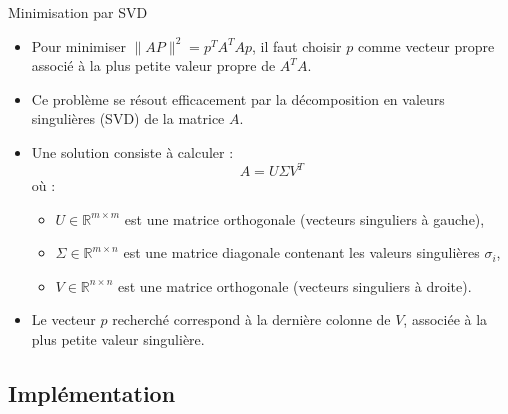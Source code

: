 \begin{frame}{Minimisation par SVD}

\begin{itemize}
  \item<1-> Pour minimiser \( \|AP\|^2 = p^T A^T A p \),  
  il faut choisir \( p \) comme vecteur propre associé à la plus petite valeur propre de \( A^T A \).
  
  \item<2-> Ce problème se résout efficacement par la décomposition en valeurs singulières (SVD) de la matrice \( A \).

  \item<3-> Une solution consiste à calculer :
  \[
  A = U \Sigma V^T
  \]
  où :
  \begin{itemize}
    \item<4-> \( U \in \mathbb{R}^{m \times m} \) est une matrice orthogonale (vecteurs singuliers à gauche),
    \item<5-> \( \Sigma \in \mathbb{R}^{m \times n} \) est une matrice diagonale contenant les valeurs singulières \( \sigma_i \),
    \item<6-> \( V \in \mathbb{R}^{n \times n} \) est une matrice orthogonale (vecteurs singuliers à droite).
  \end{itemize}
  
  \item<7-> Le vecteur \( p \) recherché correspond à la dernière colonne de \( V \), associée à la plus petite valeur singulière.
\end{itemize}
\end{frame}

\subsection{Implémentation}

